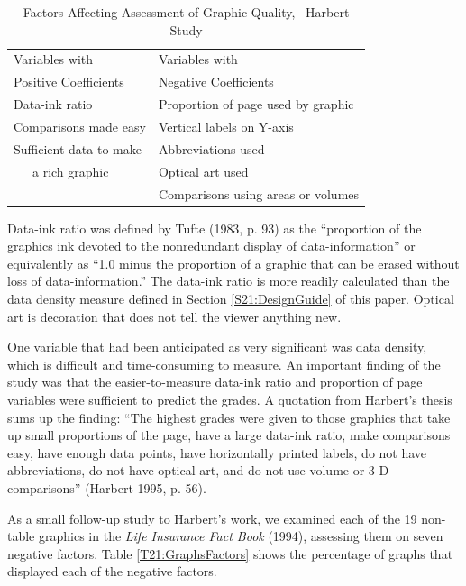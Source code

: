 \begin{table}[h] 
\caption{\label{T21:Factors} Factors Affecting Assessment of Graphic
Quality, \newline ~Harbert Study}
\begin{tabular}{ll}
\hline
Variables with & Variables with\\
Positive Coefficients & Negative Coefficients \\ \hline Data-ink
ratio
& Proportion of page used by graphic\\
Comparisons made easy &Vertical labels on Y-axis \\
Sufficient data to make  &Abbreviations used \\
~~~a rich graphic&Optical art used \\
&Comparisons using areas or volumes \\
\hline
\end{tabular}
\end{table}



Data-ink ratio was defined by Tufte (1983, p. 93) as the
``proportion of the graphics ink devoted to the nonredundant display
of data-information'' or equivalently as ``1.0 minus the proportion
of a graphic that can be erased without loss of data-information.''
The data-ink ratio is more readily calculated than the data density
measure defined in Section \ref{S21:DesignGuide} of this paper.
Optical art is decoration that does not tell the viewer anything
new.

One variable that had been anticipated as very significant was data
density, which is difficult and time-consuming to measure. An
important finding of the study was that the easier-to-measure
data-ink ratio and proportion of page variables were sufficient to
predict the grades. A quotation from Harbert's thesis sums up the
finding: ``The highest grades were given to those graphics that take
up small proportions of the page, have a large data-ink ratio, make
comparisons easy, have enough data points, have horizontally printed
labels, do not have abbreviations, do not have optical art, and do
not use volume or 3-D comparisons'' (Harbert 1995, p. 56).

As a small follow-up study to Harbert's work, we examined each of
the 19 non-table graphics in the \emph{Life Insurance Fact Book}
(1994), assessing them on seven negative factors. Table
\ref{T21:GraphsFactors} shows the percentage of graphs that
displayed each of the negative factors.


